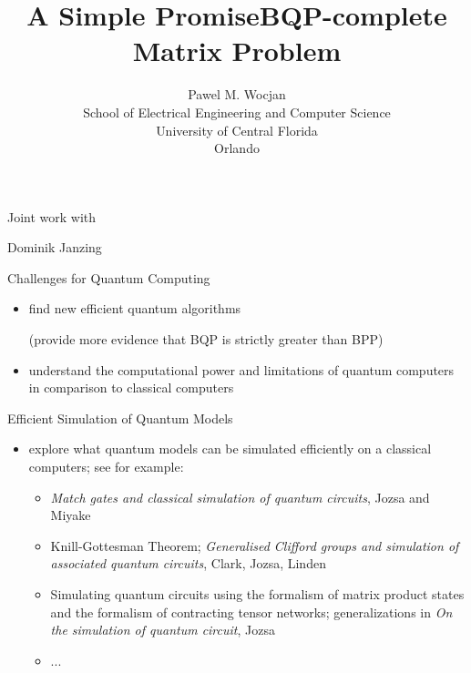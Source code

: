 \documentclass[slideColor]{prosper}
\title{A Simple PromiseBQP-complete\\ Matrix Problem}
\author{Pawel M. Wocjan\\[1ex]School of Electrical Engineering and Computer Science\\ University of Central Florida\\Orlando}
\renewcommand{\>}{\rangle}
\newcommand{\<}{\langle}
\begin{document}
\maketitle


\begin{slide}{Joint work with}
\begin{center}
Dominik Janzing
\end{center}
\end{slide}


\begin{slide}{Challenges for Quantum Computing}

\begin{itemize}
\item find new efficient quantum algorithms 

(provide more evidence that BQP is strictly greater than BPP)

\medskip
\item	understand the computational power and limitations of quantum computers in comparison to classical computers
\end{itemize}

\end{slide}


\begin{slide}{Efficient Simulation of Quantum Models}

\medskip
\begin{itemize}
\item explore what quantum models can be simulated efficiently on a classical computers; see for example:

\medskip
\begin{itemize}
\item {\em Match gates and classical simulation of quantum circuits}, Jozsa and Miyake

\medskip
\item Knill-Gottesman Theorem; {\em Generalised Clifford groups and simulation of associated quantum circuits}, Clark, Jozsa, Linden

\medskip
\item Simulating quantum circuits using the formalism of matrix product states and the formalism of contracting tensor networks;
generalizations in {\em On the simulation of quantum circuit}, Jozsa


\medskip
\item ...
\end{itemize}

\end{itemize}

\end{slide}
\end{document}
